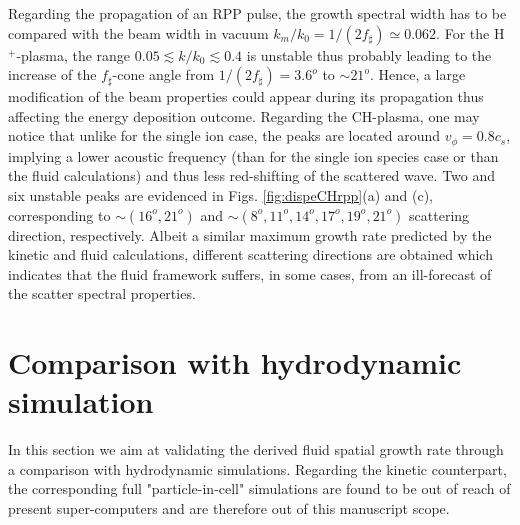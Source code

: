 \documentclass[
 reprint,
 amsmath,amssymb,
 aps,
]{revtex4-1}
\begin{document}
Regarding the propagation of an RPP pulse, the growth spectral width has to be compared with the  beam width in vacuum $k_m/k_0=1/(2f_\sharp) \simeq 0.062$.
For the H$^+$-plasma, 
the range  $0.05 \lesssim k/k_0\lesssim 0.4$ 
is unstable thus probably 
leading to the increase of the $f_\sharp$-cone 
angle from $1/(2f_\sharp)=3.6^o$ to $\sim 21^o$.
Hence, a large modification of the beam 
properties  could appear during its propagation thus affecting the energy deposition outcome.
Regarding the CH-plasma, one may notice that unlike for the single ion case, the peaks are located around $v_\phi=0.8c_s$, implying a lower acoustic frequency (than for the single ion species case or than the fluid calculations) and thus less red-shifting of the scattered wave.
Two and six unstable peaks are evidenced in Figs. \ref{fig:dispeCHrpp}(a) and (c), corresponding to $\sim (16^o,21^o)$ and $ \sim (8^o,11^o,14^o,17^o,19^o,21^o)$ scattering direction, respectively.
Albeit  a similar maximum growth rate  predicted by the kinetic and fluid calculations, different scattering directions are obtained which indicates that the fluid framework  suffers, in some cases, from an ill-forecast of the scatter spectral properties. 

\section{Comparison with hydrodynamic simulation}
In this section we aim at validating the derived fluid spatial growth rate through a  comparison with hydrodynamic simulations. Regarding the kinetic counterpart, the corresponding full "particle-in-cell" simulations are found to be out of reach of present super-computers and are therefore out of this manuscript scope. 
\end{document}
